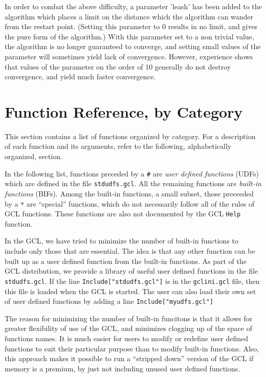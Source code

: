 In order to combat the above difficulty, a parameter 'leash' has been
added to the algorithm which places a limit on the distance which the
algorithm can wander from the restart point. (Setting this parameter
to 0 results in no limit, and gives the pure form of the algorithm.)
With this parameter set to a non trivial value, the algorithm is no
longer guaranteed to converge, and setting small values of the
parameter will sometimes yield lack of convergence.  However,
experience shows that values of the parameter on the order of 10
generally do not destroy convergence, and yield much faster
convergence.

\chapter{Function Reference, by Category}

This section contains a list of functions organized by
category.  For a description of each function and its arguments,
refer to the following, alphabetically organized, section.  

In the following list, functions preceded by a \verb+#+ are {\it user
defined functions} (UDFs) which are defined in the file
\verb+stdudfs.gcl+.  All the remaining functions are {\it built-in
functions} (BIFs).  Among the built-in functions, a small subset,
those preceeded by a \verb+*+ are ``special'' functions, which do not
necessarily follow all of the rules of GCL functions.  These functions
are also not documented by the GCL \verb+Help+ function.  

In the GCL, we have tried to minimize the number of built-in functions
to include only those that are essential.  The idea is that any other
function can be built up as a user defined function from the built-in
functions.  As part of the GCL distribution, we provide a library of
useful user defined functions in the file \verb+stdudfs.gcl+.  If the
line \verb+Include["stdudfs.gcl"]+ is in the \verb+gclini.gcl+ file,
then this file is loaded when the GCL is started.  The user can also
load their own set of user defined functions by adding a line
\verb+Include["myudfs.gcl"]+

The reason for minimizing the number of built-in funcitons is that it
allows for greater flexibility of use of the GCL, and minimizes
clogging up of the space of functions names.  It is much easier for
users to modify or redefine user defined functions to suit their
particular purpose than to modify built-in functions.  Also, this
approach makes it possible to run a ``stripped down'' version of the
GCL if memory is a premium, by just not including unused user defined
functions.

